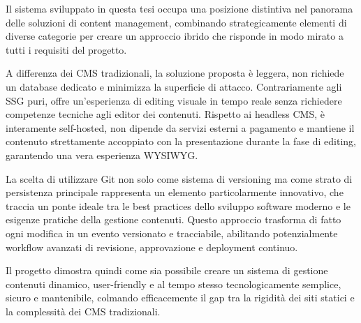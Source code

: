 Il sistema sviluppato in questa tesi occupa una posizione distintiva nel panorama delle soluzioni di content management, combinando strategicamente elementi di diverse categorie per creare un approccio ibrido che risponde in modo mirato a tutti i requisiti del progetto.

A differenza dei CMS tradizionali, la soluzione proposta è leggera, non richiede un database dedicato e minimizza la superficie di attacco. Contrariamente agli SSG puri, offre un'esperienza di editing visuale in tempo reale senza richiedere competenze tecniche agli editor dei contenuti. Rispetto ai headless CMS, è interamente self-hosted, non dipende da servizi esterni a pagamento e mantiene il contenuto strettamente accoppiato con la presentazione durante la fase di editing, garantendo una vera esperienza WYSIWYG.

La scelta di utilizzare Git non solo come sistema di versioning ma come strato di persistenza principale rappresenta un elemento particolarmente innovativo, che traccia un ponte ideale tra le best practices dello sviluppo software moderno e le esigenze pratiche della gestione contenuti. Questo approccio trasforma di fatto ogni modifica in un evento versionato e tracciabile, abilitando potenzialmente workflow avanzati di revisione, approvazione e deployment continuo.

Il progetto dimostra quindi come sia possibile creare un sistema di gestione contenuti dinamico, user-friendly e al tempo stesso tecnologicamente semplice, sicuro e mantenibile, colmando efficacemente il gap tra la rigidità dei siti statici e la complessità dei CMS tradizionali.